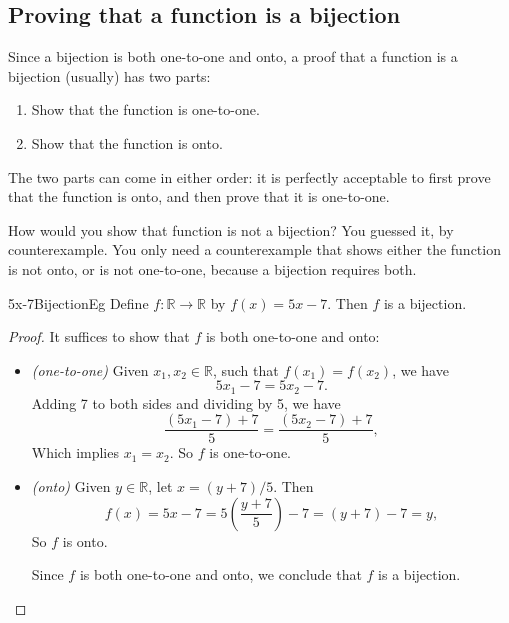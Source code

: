 \subsection{Proving that a function is a bijection}

Since a bijection  is both one-to-one and onto, a proof that a function is a bijection (usually) has two parts:
	\begin{enumerate}
	\item Show that the function is one-to-one.
	\item Show that the function is onto.
	\end{enumerate}
The two parts can come in either order: it is perfectly acceptable to first prove that the function is onto, and then prove that it is one-to-one.

How would you show that function is not a bijection?  You guessed it, by counterexample.  You only need a counterexample that shows either the function is not onto, or is not one-to-one, because a bijection requires both.

\begin{example}{5x-7BijectionEg}
Define $f \colon \mathbb{R} \to \mathbb{R}$ by $f(x) = 5x-7$. Then $f$ is a bijection.

\begin{proof}
It suffices to show that $f$ is both one-to-one and onto:
\begin{itemize}
\item  \emph{(one-to-one)} Given $x_1,x_2 \in \mathbb{R}$, such that $f(x_1) = f(x_2)$, we have
$$5x_1 - 7 = 5x_2 - 7.$$
\medskip
\noindent
Adding 7 to both sides and dividing by 5, we have
$$ \frac{(5x_1-7)+7}{5} =  \frac{(5x_2-7)+7}{5},$$
\noindent
Which implies $x_1=x_2$. So $f$ is one-to-one.
\item
\emph{(onto)}  Given $y \in \mathbb{R}$, let $x = (y+7)/5$. Then
$$ f(x) = 5x-7 = 5 \left( \frac{y+7}{5} \right) - 7 = (y+7) - 7 = y,$$
So $f$ is onto.

Since $f$ is both one-to-one and onto, we conclude that $f$ is a bijection.
\end{itemize}
\end{proof}
\end{example} 

